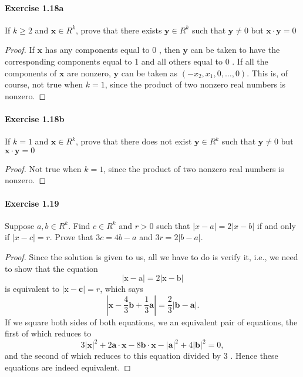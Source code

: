 \documentclass{article}
\theoremstyle{definition}
\begin{document}
\paragraph{Exercise 1.18a} If $k \geq 2$ and $\mathbf{x} \in R^{k}$, prove that there exists $\mathbf{y} \in R^{k}$ such that $\mathbf{y} \neq 0$ but $\mathbf{x} \cdot \mathbf{y}=0$
\begin{proof}
    If $\mathbf{x}$ has any components equal to 0 , then $\mathbf{y}$ can be taken to have the corresponding components equal to 1 and all others equal to 0 . If all the components of $\mathbf{x}$ are nonzero, $\mathbf{y}$ can be taken as $\left(-x_2, x_1, 0, \ldots, 0\right)$. This is, of course, not true when $k=1$, since the product of two nonzero real numbers is nonzero.
\end{proof}


\paragraph{Exercise 1.18b} If $k = 1$ and $\mathbf{x} \in R^{k}$, prove that there does not exist $\mathbf{y} \in R^{k}$ such that $\mathbf{y} \neq 0$ but $\mathbf{x} \cdot \mathbf{y}=0$
\begin{proof}
    Not true when $k=1$, since the product of two nonzero real numbers is nonzero.
\end{proof}


\paragraph{Exercise 1.19} Suppose $a, b \in R^k$. Find $c \in R^k$ and $r > 0$ such that $|x-a|=2|x-b|$ if and only if $| x - c | = r$. Prove that $3c = 4b - a$ and $3r = 2 |b - a|$.
\begin{proof}
    Since the solution is given to us, all we have to do is verify it, i.e., we need to show that the equation
$$
|\mathrm{x}-\mathrm{a}|=2|\mathrm{x}-\mathrm{b}|
$$
is equivalent to $|\mathrm{x}-\mathbf{c}|=r$, which says
$$
\left|\mathbf{x}-\frac{4}{3} \mathbf{b}+\frac{1}{3} \mathbf{a}\right|=\frac{2}{3}|\mathbf{b}-\mathbf{a}| .
$$
If we square both sides of both equations, we an equivalent pair of equations, the first of which reduces to
$$
3|\mathbf{x}|^2+2 \mathbf{a} \cdot \mathbf{x}-8 \mathbf{b} \cdot \mathbf{x}-|\mathbf{a}|^2+4|\mathbf{b}|^2=0,
$$
and the second of which reduces to this equation divided by 3 . Hence these equations are indeed equivalent.
\end{proof}
\end{document}

